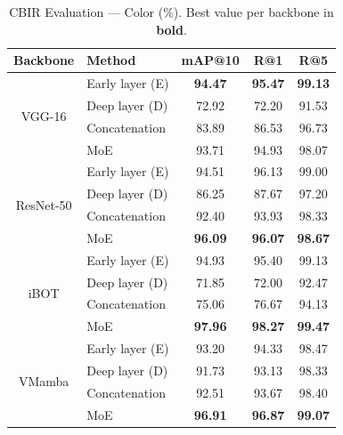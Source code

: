 \documentclass[conference]{IEEEtran}
\begin{document}
\begin{table}[htbp]
\caption{CBIR Evaluation --- Color (\%). Best value per backbone in
         \textbf{bold}.}
\begin{center}
\begin{tabular}{c|l|c|c|c}
\hline
\textbf{Backbone} & \textbf{Method} & \textbf{mAP@10}
                  & \textbf{R@1} & \textbf{R@5} \\
\hline
\multirow{4}{*}{VGG-16}
  & Early layer (E)         & \textbf{94.47} & \textbf{95.47} & \textbf{99.13} \\
  & Deep layer (D)          & 72.92 & 72.20 & 91.53 \\
  & Concatenation           & 83.89 & 86.53 & 96.73 \\
  & MoE                     & 93.71 & 94.93 & 98.07 \\
\hline
\multirow{4}{*}{ResNet-50}
  & Early layer (E)         & 94.51 & 96.13 & 99.00 \\
  & Deep layer (D)          & 86.25 & 87.67 & 97.20 \\
  & Concatenation           & 92.40 & 93.93 & 98.33 \\
  & MoE                     & \textbf{96.09} & \textbf{96.07} & \textbf{98.67} \\
\hline
\multirow{4}{*}{iBOT}
  & Early layer (E)         & 94.93 & 95.40 & 99.13 \\
  & Deep layer (D)          & 71.85 & 72.00 & 92.47 \\
  & Concatenation           & 75.06 & 76.67 & 94.13 \\
  & MoE                     & \textbf{97.96} & \textbf{98.27} & \textbf{99.47} \\
\hline
\multirow{4}{*}{VMamba}
  & Early layer (E)         & 93.20 & 94.33 & 98.47 \\
  & Deep layer (D)          & 91.73 & 93.13 & 98.33 \\
  & Concatenation           & 92.51 & 93.67 & 98.40 \\
  & MoE                     & \textbf{96.91} & \textbf{96.87} & \textbf{99.07} \\
\hline
\end{tabular}
\label{tab_cbir_color}
\end{center}
\end{table}
\end{document}
